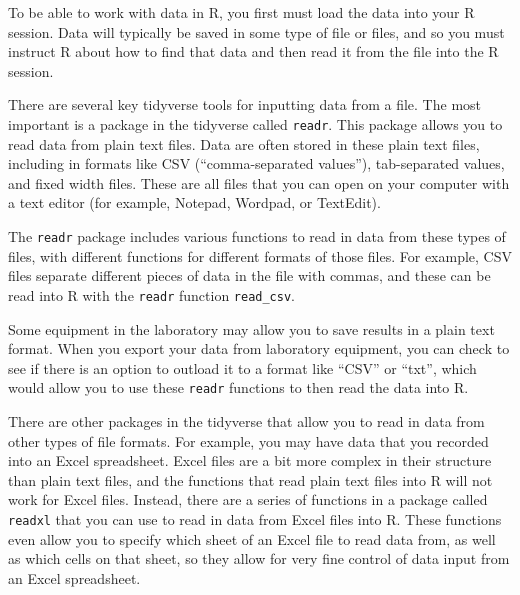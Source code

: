 \documentclass[]{tufte-book}
\begin{document}
To be able to work with data in R, you first must load the data into your R
session. Data will typically be saved in some type of file or files, and
so you must instruct R about how to find that data and then read it from
the file into the R session.

There are several key tidyverse tools for inputting data from a file. The
most important is a package in the tidyverse called \texttt{readr}. This package
allows you to read data from plain text files. Data are often stored in
these plain text files, including in formats like CSV (``comma-separated
values''), tab-separated values, and fixed width files. These are all files
that you can open on your computer with a text editor (for example,
Notepad, Wordpad, or TextEdit).

The \texttt{readr} package includes various functions to read in data from these
types of files, with different functions for different formats of those
files. For example, CSV files separate different pieces of data in the
file with commas, and these can be read into R with the \texttt{readr} function
\texttt{read\_csv}.

Some equipment in the laboratory may allow you to save results in a plain
text format. When you export your data from laboratory equipment, you can
check to see if there is an option to outload it to a format like ``CSV''
or ``txt'', which would allow you to use these \texttt{readr} functions to then
read the data into R.

There are other packages in the tidyverse that allow you to read in data
from other types of file formats. For example, you may have data that
you recorded into an Excel spreadsheet. Excel files are a bit more complex
in their structure than plain text files, and the functions that read
plain text files into R will not work for Excel files. Instead, there are
a series of functions in a package called \texttt{readxl} that you can use to
read in data from Excel files into R. These functions even allow you to
specify which sheet of an Excel file to read data from, as well as which
cells on that sheet, so they allow for very fine control of data input
from an Excel spreadsheet.
\end{document}
